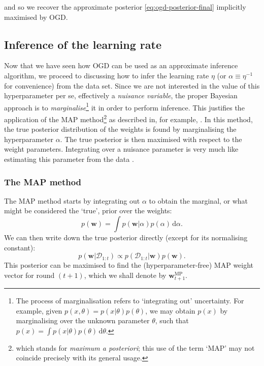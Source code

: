 and so we recover the approximate posterior \eqref{eq:ogd-posterior-final} implicitly maximised by OGD.

\subsection{Inference of the learning rate}
\label{sec:learning-rate-inference}

Now that we have seen how OGD can be used as an approximate inference algorithm, we proceed to discussing how to infer the learning rate $\eta$ (or $\alpha \equiv \eta^{-1}$ for convenience) from the data set. Since we are not interested in the value of this hyperparameter per se, effectively a \emph{nuisance variable}, the proper Bayesian approach is to \emph{marginalise}\footnote{The process of marginalisation refers to `integrating out' uncertainty. For example, given $p(x, \theta) = p(x|\theta)p(\theta)$, we may obtain $p(x)$ by marginalising over the unknown parameter $\theta$, such that $p(x) = \int p(x|\theta)p(\theta) \, \mathrm{d}\theta$.} it in order to perform inference. This justifies the application of the MAP method\footnote{which stands for \emph{maximum a posteriori}; this use of the term `MAP' may not coincide precisely with its general usage.} as described in, for example, \citep{mackay96}. In this method, the true posterior distribution of the weights is found by marginalising the hyperparameter $\alpha$. The true posterior is then maximised with respect to the weight parameters. Integrating over a nuisance parameter is very much like estimating this parameter from the data \citep{bretthorst88, box-tiao73}.

\subsubsection{The MAP method}

The MAP method starts by integrating out $\alpha$ to obtain the marginal, or what might be considered the `true', prior over the weights:
\begin{equation}
\label{eq:true-weight-prior}
	p(\mathbf{w})
	= \int p(\mathbf{w}|\alpha)p(\alpha)\, \mathrm{d}\alpha.
\end{equation}
We can then write down the true posterior directly (except for its normalising constant):
\begin{equation}
	p(\mathbf{w}|\mathcal{D}_{1:t})
	\propto p(\mathcal{D}_{1:t}|\mathbf{w})p(\mathbf{w}).
\end{equation}
This posterior can be maximised to find the (hyperparameter-free) MAP weight vector for round $(t+1)$, which we shall denote by $\mathbf{w}_{t+1}^\text{MP}$.

